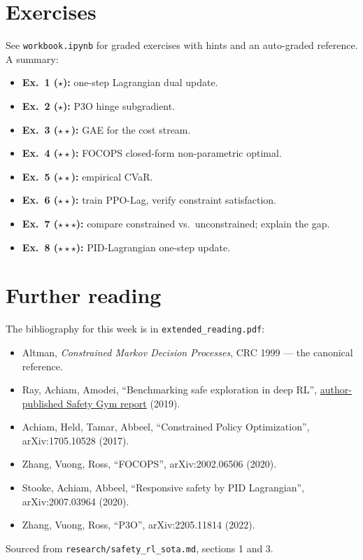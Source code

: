 \documentclass[11pt,oneside]{scrbook}
\begin{document}
\chapter{Exercises}

See \texttt{workbook.ipynb} for graded exercises with hints and an
auto-graded reference. A summary:

\begin{itemize}[leftmargin=*]
  \item \textbf{Ex.\ 1 ($\star$):} one-step Lagrangian dual update.
  \item \textbf{Ex.\ 2 ($\star$):} P3O hinge subgradient.
  \item \textbf{Ex.\ 3 ($\star\star$):} GAE for the cost stream.
  \item \textbf{Ex.\ 4 ($\star\star$):} FOCOPS closed-form non-parametric optimal.
  \item \textbf{Ex.\ 5 ($\star\star$):} empirical CVaR.
  \item \textbf{Ex.\ 6 ($\star\star$):} train PPO-Lag, verify constraint
        satisfaction.
  \item \textbf{Ex.\ 7 ($\star\star\star$):} compare constrained vs.\
        unconstrained; explain the gap.
  \item \textbf{Ex.\ 8 ($\star\star\star$):} PID-Lagrangian one-step update.
\end{itemize}

\chapter{Further reading}

The bibliography for this week is in \texttt{extended\_reading.pdf}:
\begin{itemize}[leftmargin=*]
  \item Altman, \emph{Constrained Markov Decision Processes}, CRC 1999 --- the canonical reference.
  \item Ray, Achiam, Amodei, ``Benchmarking safe exploration in deep RL'', \href{https://cdn.openai.com/safexp-short.pdf}{author-published Safety Gym report} (2019).
  \item Achiam, Held, Tamar, Abbeel, ``Constrained Policy Optimization'', arXiv:1705.10528 (2017).
  \item Zhang, Vuong, Ross, ``FOCOPS'', arXiv:2002.06506 (2020).
  \item Stooke, Achiam, Abbeel, ``Responsive safety by PID Lagrangian'', arXiv:2007.03964 (2020).
  \item Zhang, Vuong, Ross, ``P3O'', arXiv:2205.11814 (2022).
\end{itemize}

Sourced from \texttt{research/safety\_rl\_sota.md}, sections 1 and 3.
\end{document}
